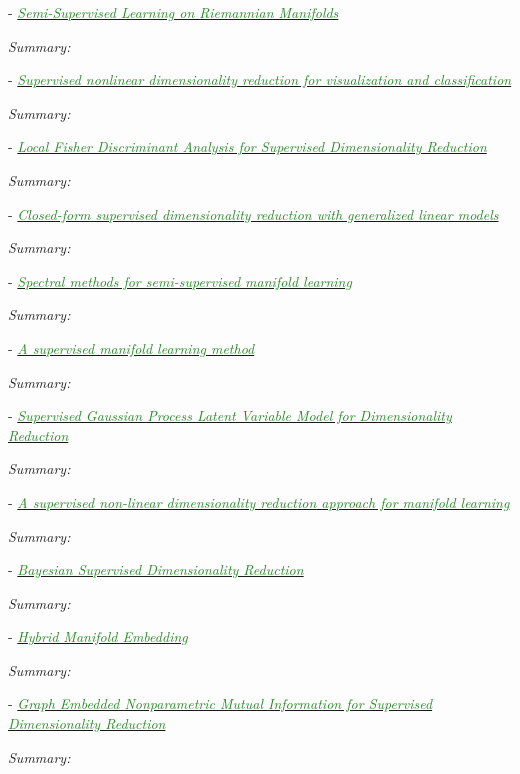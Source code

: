 \documentclass[]{article}
\newcommand{\paperentry}[4]{
            \hangindent=1cm
            \cite{#1} - \href{run:../References/#3}{\textcolor{ForestGreen}{\textit{#2}}}
            
            \noindent            
            \begin{minipage}[t]{0.1\linewidth}\hfill\end{minipage}
            \begin{minipage}[t]{0.8\linewidth}\textcolor{NavyBlue}{{\textit{Summary:}}}#4\end{minipage}
            \vspace{.25cm}
          }
\begin{document}
	
	\paperentry{Belkin2004SemiSupLearningRiemannianManifolds}
	{Semi-Supervised Learning on Riemannian Manifolds}
	{Manifold_Representation_Learning/Supervised/Belkin2004SemiSupLearningRiemannianManifolds.pdf}
	{}
	
	\paperentry{Geng2005SupNonlinearDimRed}
	{Supervised nonlinear dimensionality reduction for visualization and classification}
	{Manifold_Representation_Learning/Supervised/Geng2005SupNonlinearDimRed.pdf}
	{}
	
	\paperentry{Sugiyama2006FDASupDimRed}
	{Local Fisher Discriminant Analysis for Supervised Dimensionality Reduction}
	{Manifold_Representation_Learning/Supervised/Sugiyama2006FDASupDimRed.pdf}
	{}
	
	\paperentry{Rish2008SupDimRedGLM}
	{Closed-form supervised dimensionality reduction with generalized linear models}
	{Manifold_Representation_Learning/Supervised/Rish2008SupDimRedGLM.pdf}
	{}
	
	\paperentry{Zhang2008SpectralSemiSupManifoldLearning}
	{Spectral methods for semi-supervised manifold learning}
	{Manifold_Representation_Learning/Supervised/Zhang2008SpectralSemiSupManifoldLearning.pdf}
	{}
	
	\paperentry{Li2009SupManifoldLearning}
	{A supervised manifold learning method}
	{Manifold_Representation_Learning/Supervised/Li2009SupManifoldLearning.pdf}
	{}
	
	\paperentry{Gao2011SupGPLVMDimRed}
	{Supervised Gaussian Process Latent Variable Model for Dimensionality Reduction}
	{Manifold_Representation_Learning/Supervised/Gao2011SupGPLVMDimRed.pdf}
	{}
	
	
	\paperentry{Raducanu2012SupervisedNonlinearDimReduction}
	{A supervised non-linear dimensionality reduction approach for manifold learning}
	{Manifold_Representation_Learning/Supervised/Raducanu2012SupervisedNonlinearDimReduction.pdf}
	{}
	
	\paperentry{Gonen2013BayesianSupDimRed}
	{Bayesian Supervised Dimensionality Reduction}
	{Manifold_Representation_Learning/Supervised/Gonen2013BayesianSupDimRed.pdf}
	{}
	
	\paperentry{Liu2014HybridManifoldEmbedding}
	{Hybrid Manifold Embedding}
	{Manifold_Representation_Learning/Supervised/Liu2014HybridManifoldEmbedding.pdf}
	{}
	
	\paperentry{Bouzas2015GraphEmbeddedMutualInformationSupDimRed}
	{Graph Embedded Nonparametric Mutual Information for Supervised Dimensionality Reduction}
	{Manifold_Representation_Learning/Supervised/Bouzas2015GraphEmbeddedMutualInformationSupDimRed.pdf}
	{}
	
\end{document}
